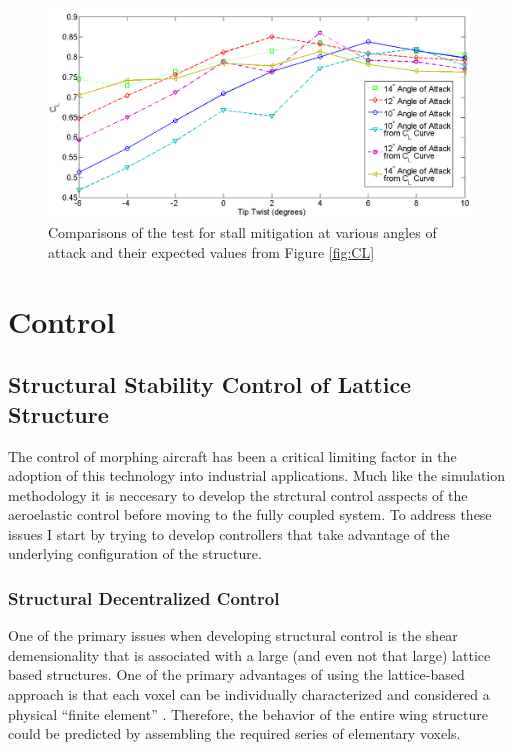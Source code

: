 \documentclass[11pt]{ucthesis}
\begin{document}
\begin{figure}[h]
\centering
\includegraphics[width=1\linewidth]{Figures/StallMitigationCompare.png}
\caption{Comparisons of the test for stall mitigation at various angles of attack and their expected values from Figure \ref{fig:CL}}
\label{fig:SM}
\end{figure}

\chapter{Control}
\section{Structural Stability Control of Lattice Structure}
The control of morphing aircraft has been a critical limiting factor in the adoption of this technology into industrial applications. Much like the simulation methodology it is neccesary to develop the strctural control asspects of the aeroelastic control before moving to the fully coupled system. To address these issues I start by trying to develop controllers that take advantage of the underlying configuration of the structure.

\subsection{Structural Decentralized Control}
\label{sec:decentral}
One of the primary issues when developing structural control is the shear demensionality that is associated with a large (and even not that large) lattice based structures. One of the primary advantages of using the lattice-based approach is that each voxel can be individually characterized and considered a physical ``finite element'' \cite{calisch2014physical}. Therefore, the behavior of the entire wing structure could be predicted by assembling the required series of elementary voxels. 
\end{document}
